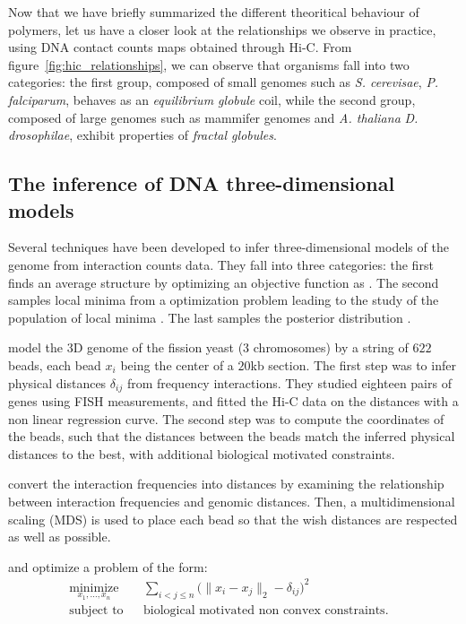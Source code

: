 Now that we have briefly summarized the different theoritical behaviour of
polymers, let us have a closer look at the relationships we
observe in practice, using DNA contact counts maps obtained through Hi-C.
From figure~\ref{fig:hic_relationships},
we can observe that organisms fall into two
categories: the first group, composed of small genomes such as \textit{S.
cerevisae}, \textit{P. falciparum}, behaves as an \textit{equilibrium globule}
coil, while the second group, composed of large genomes such as mammifer
genomes and \textit{A. thaliana} \textit{D. drosophilae}, exhibit properties
of \textit{fractal globules}.

\subsection{The inference of DNA three-dimensional models}


Several techniques have been developed to infer three-dimensional models of
the genome from interaction counts data. They fall into three categories: the
first finds an average structure by optimizing an objective function as
\citep{tanizawa:mapping, duan:three-dimensional, ben-elazar:spatial}. The
second samples local minima from a optimization problem leading to the study
of the population of local minima \citep{bau:three-dimensional}. The last
samples the posterior distribution \citep{rousseau:three}.

\citet{tanizawa:mapping} model the 3D genome of the fission yeast (3
chromosomes) by a string of $622$ beads, each bead $x_i$ being the center of a
$20$kb section. The first step was to infer physical distances $\delta_{ij}$
from frequency interactions. They studied eighteen pairs of genes using FISH
measurements, and fitted the Hi-C data on the distances with a non linear
regression curve. The second step was to compute the coordinates of the beads,
such that the distances between the beads match the inferred physical
distances to the best, with additional biological motivated constraints.

\citet{duan:three-dimensional} convert the interaction frequencies into distances by
examining the relationship between interaction frequencies and genomic
distances. Then, a multidimensional scaling (MDS) is used to place each bead
so that the wish distances are respected as well as possible.

\citet{tanizawa:mapping} and \citet{duan:three-dimensional} optimize a problem of the
form:
\begin{equation*}
\renewcommand{\arraystretch}{2}
\begin{array}{ccll}
\underset{x_1,\ldots, x_n}{\text{minimize}} & &
\underset{i<j\leq n}{\sum} \big(\|x_i - x_j\|_2 - \delta_{ij}\big)^2 &\\
\text{subject to}
& & \text{biological motivated non convex constraints.}
\end{array}
\end{equation*}

